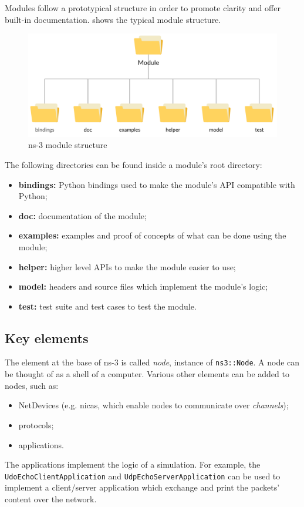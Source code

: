 		
		Modules follow a prototypical structure in order to promote clarity and offer built-in documentation.  shows the typical module structure.
		
		\begin{figure}[H]
			\centering
			\includegraphics[width=\textwidth]{immagini/ns-3-module}
			\caption{ns-3 module structure}
			\label{fig:ns-3-module}
		\end{figure}
		
		The following directories can be found inside a module's root directory:
		\begin{itemize}
			\item \textbf{bindings:} Python bindings used to make the module's API compatible with Python;
			\item \textbf{doc:} documentation of the module;
			\item \textbf{examples:} examples and proof of concepts of what can be done using the module;
			\item \textbf{helper:} higher level APIs to make the module easier to use;
			\item \textbf{model:} headers and source files which implement the module's logic; 
			\item \textbf{test:} test suite and test cases to test the module.
		\end{itemize}
	
		\subsection{Key elements}
			The element at the base of ns-3 is called \textit{node}, instance of \texttt{ns3::Node}. A node can be thought of as a shell of a computer. Various other elements can be added to nodes, such as:
			\begin{itemize}
				\item NetDevices (e.g. \acrshort{nica}s, which enable nodes to communicate over \textit{channels});
				\item protocols;
				\item applications. 
			\end{itemize}
			The applications implement the logic of a simulation. For example, the \texttt{UdoEchoClientApplication} and \texttt{UdpEchoServerApplication} can be used to implement a client/server application which exchange and print the packets' content over the network.
			
